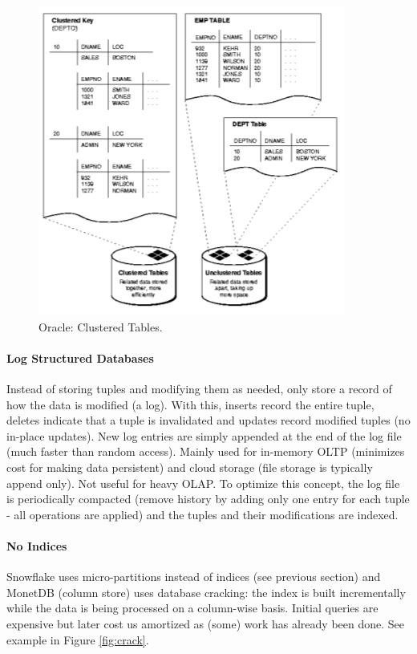 \begin{figure}[h]
	\centering
	\includegraphics[scale=0.8]{images/2-cluster.PNG}
	\caption{Oracle: Clustered Tables.}
	\label{fig:cluster}
\end{figure}

\paragraph{Log Structured Databases}
Instead of storing tuples and modifying them as needed, only store a record of how the data is modified (a log). With this, inserts record the entire tuple, deletes indicate that a tuple is invalidated and updates record modified tuples (no in-place updates). New log entries are simply appended at the end of the log file (much faster than random access). Mainly used for in-memory OLTP (minimizes cost for making data persistent) and cloud storage (file storage is typically append only). Not useful for heavy OLAP. To optimize this concept, the log file is periodically compacted (remove history by adding only one entry for each tuple - all operations are applied) and the tuples and their modifications are indexed. %

\paragraph{No Indices}
Snowflake uses micro-partitions instead of indices (see previous section) and MonetDB (column store) uses database cracking: the index is built incrementally while the data is being processed on a column-wise basis. Initial queries are expensive but later cost us amortized as (some) work has already been done. See example in Figure \ref{fig:crack}. %

